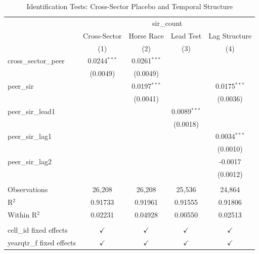 
\begin{table}[htbp]
   \caption{\label{tab:identification} Identification Tests: Cross-Sector Placebo and Temporal Structure}
   \bigskip
   \centering
   \begin{tabular}{lcccc}
      \toprule
       & \multicolumn{4}{c}{sir\_count}\\
                                & Cross-Sector   & Horse Race     & Lead Test      & Lag Structure \\   
                                & (1)            & (2)            & (3)            & (4)\\  
      \midrule 
      cross\_sector\_peer       & 0.0244$^{***}$ & 0.0261$^{***}$ &                &   \\   
                                & (0.0049)       & (0.0049)       &                &   \\   
      peer\_sir                 &                & 0.0197$^{***}$ &                & 0.0175$^{***}$\\   
                                &                & (0.0041)       &                & (0.0036)\\   
      peer\_sir\_lead1          &                &                & 0.0089$^{***}$ &   \\   
                                &                &                & (0.0018)       &   \\   
      peer\_sir\_lag1           &                &                &                & 0.0034$^{***}$\\   
                                &                &                &                & (0.0010)\\   
      peer\_sir\_lag2           &                &                &                & -0.0017\\   
                                &                &                &                & (0.0012)\\   
       \\
      Observations              & 26,208         & 26,208         & 25,536         & 24,864\\  
      R$^2$                     & 0.91733        & 0.91961        & 0.91555        & 0.91806\\  
      Within R$^2$              & 0.02231        & 0.04928        & 0.00550        & 0.02513\\  
       \\
      cell\_id fixed effects    & $\checkmark$   & $\checkmark$   & $\checkmark$   & $\checkmark$\\   
      yearqtr\_f fixed effects  & $\checkmark$   & $\checkmark$   & $\checkmark$   & $\checkmark$\\   
      \bottomrule
   \end{tabular}
   

\end{table}
